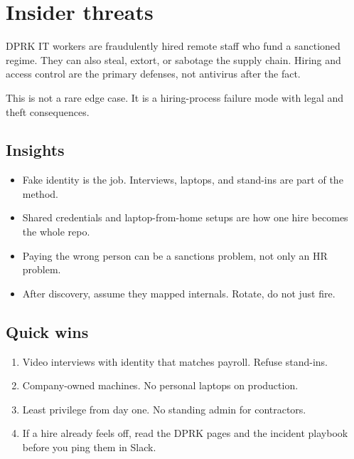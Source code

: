 \chapter{Insider threats}

DPRK IT workers are fraudulently hired remote staff who
fund a sanctioned regime. They can also steal, extort,
or sabotage the supply chain. Hiring and access control
are the primary defenses, not antivirus after the fact.

This is not a rare edge case. It is a hiring-process
failure mode with legal and theft consequences.

\section{Insights}

\begin{itemize}
  \item Fake identity is the job. Interviews, laptops,
  and stand-ins are part of the method.
  \item Shared credentials and laptop-from-home setups
  are how one hire becomes the whole repo.
  \item Paying the wrong person can be a sanctions
  problem, not only an HR problem.
  \item After discovery, assume they mapped internals.
  Rotate, do not just fire.
\end{itemize}

\section{Quick wins}

\begin{enumerate}
  \item Video interviews with identity that matches
  payroll. Refuse stand-ins.
  \item Company-owned machines. No personal laptops on
  production.
  \item Least privilege from day one. No standing admin
  for contractors.
  \item If a hire already feels off, read the DPRK
  pages and the incident playbook before you ping them
  in Slack.
\end{enumerate}
